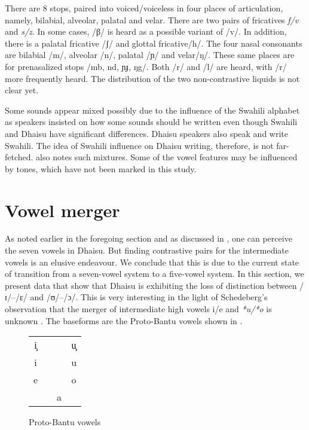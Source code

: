 \documentclass[output=paper,colorlinks,citecolor=brown]{langscibook}
\begin{document}
There are 8 stops, paired into voiced/voiceless in four places of articulation, namely, bilabial, alveolar, palatal and velar. There are two pairs of fricatives \textit{f/v} and \textit{s/z}. In some cases, /β/ is heard as a possible variant of /v/. In addition, there is a palatal fricative /ʃ/ and glottal fricative/h/. The four nasal consonants are bilabial /m/, alveolar /n/, palatal /ɲ/ and velar/ŋ/. These same places are for prenasalized stops /mb, nd, ɲɟ, ŋg/. Both /r/ and /l/ are heard, with /r/ more frequently heard. The distribution of the two non-contrastive liquids is not clear yet.
 
Some sounds appear mixed possibly due to the influence of the Swahili alphabet as speakers insisted on how some sounds should be written even though Swahili and Dhaisu have significant differences. Dhaisu speakers also speak and write Swahili. The idea of Swahili influence on Dhaisu writing, therefore, is not far-fetched. \citet{Nurse2000} also notes such mixtures. Some of the vowel features may be influenced by tones, which have not been marked in this study.


\section{Vowel merger}\label{sec:ngonyani:3}

As noted earlier in the foregoing section and as discussed in \citet{Nurse2000}, one can perceive the seven vowels in Dhaisu. But finding contrastive pairs for the intermediate vowels is an elusive endeavour. We conclude that this is due to the current state of transition from a seven-vowel system to a five-vowel system. In this section, we present data that show that Dhaisu is exhibiting the loss of distinction between /ɪ/--/ɛ/ and /ʊ/--/ɔ/. This is very interesting in the light of Schedeberg's observation that the merger of intermediate high vowels i/e and \textit{*u/*o} is unknown \citep[74]{Schadeberg1995}. The baseforms are the Proto-Bantu vowels  shown in .

\begin{figure}
	\caption{Proto-Bantu vowels \citep[82]{Meeussen1967}}
    \label{tab:ngonyani:3}
        \begin{tabular}{cccc}
        i̧ &    &   & u̧\\
        i &    &   & u\\
        e &    &   & o \\
          &    & a &   \\
        \end{tabular}
\end{figure}
\end{document}
